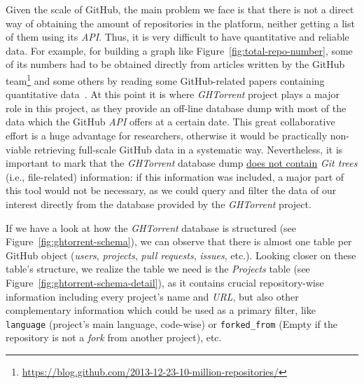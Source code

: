 \documentclass[a4paper, 12pt]{book}
\begin{document}
Given the scale of GitHub, the main problem we face is that there is not a direct way
of obtaining the amount of repositories in the platform, neither getting a list of them using its \textit{API}.
Thus, it is
very difficult to have quantitative and reliable data. For example, for building a graph like Figure~\ref{fig:total-repo-number},
some of its numbers had to be obtained directly from articles written by the GitHub team\footnote{\url{https://blog.github.com/2013-12-23-10-million-repositories/}}
and some others by reading some GitHub-related papers containing quantitative data~\cite{Gousios:2014:LGG:2597073.2597126}.
At this point it is where \emph{GHTorrent} project plays a major role in this project, as they provide an off-line database dump with most
of the data which the GitHub \textit{API} offers at a certain date. This great collaborative effort is a huge advantage
for researchers, otherwise it would be practically non-viable retrieving full-scale GitHub data in a systematic way.
Nevertheless, it is important to mark that the \emph{GHTorrent} database dump \underline{does not contain} \textit{Git trees}
(i.e., file-related) information: if this information was included, a major part of this tool would not
be necessary, as we could query and filter the data of our interest directly from the database provided by the \emph{GHTorrent} project.

If we have a look at how the \emph{GHTorrent} database is structured (see Figure~\ref{fig:ghtorrent-schema}), we can observe that
there is almost one table per GitHub object (\textit{users}, \textit{projects}, \textit{pull requests}, \textit{issues}, etc.).
Looking closer on these table's structure, we realize the table we need is the \emph{Projects} table
(see Figure~\ref{fig:ghtorrent-schema-detail}), as it contains crucial repository-wise information including every project's name
and \textit{URL}, but also other complementary information which could be used as a primary filter, like \texttt{language} (project's main language,
code-wise) or \texttt{forked\_from} (Empty if the repository is not a \textit{fork} from another project), etc.
\end{document}
